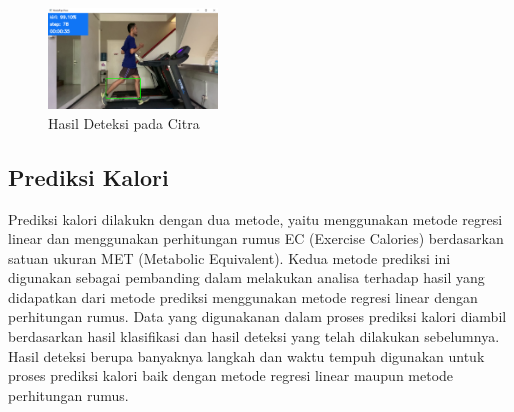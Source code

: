 \begin{figure} [ht]
  \centering
  \includegraphics[width=0.4\textwidth]{gambar/hasil deteksi.png}
  \caption{Hasil Deteksi pada Citra}
  \label{fig:HasilDeteksi}
\end{figure}

\subsection{Prediksi Kalori}
\label{subsec:PrediksiKalori}

Prediksi kalori dilakukn dengan dua metode, yaitu menggunakan metode regresi linear dan menggunakan perhitungan rumus EC (Exercise Calories) berdasarkan satuan ukuran MET (Metabolic Equivalent). Kedua metode prediksi ini digunakan sebagai pembanding dalam melakukan analisa terhadap hasil yang didapatkan dari metode prediksi menggunakan metode regresi linear dengan perhitungan rumus. Data yang digunakanan dalam proses prediksi kalori diambil berdasarkan hasil klasifikasi dan hasil deteksi yang telah dilakukan sebelumnya. Hasil deteksi berupa banyaknya langkah dan waktu tempuh digunakan untuk proses prediksi kalori baik dengan metode regresi linear maupun metode perhitungan rumus.

